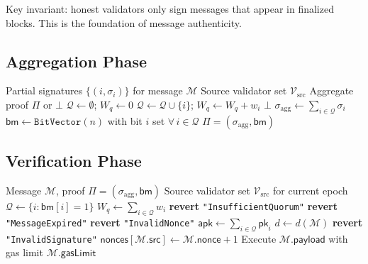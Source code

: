 Key invariant: honest validators only sign messages that appear in finalized blocks. This is the foundation of message authenticity.

\subsection{Aggregation Phase}

\begin{algorithm}[H]
\caption{Signature Aggregation (Relayer)}
\label{alg:aggregation}
\begin{algorithmic}[1]
\Require Partial signatures $\{(i, \sigma_i)\}$ for message $\mathcal{M}$
\Require Source validator set $\mathcal{V}_{\text{src}}$
\Ensure Aggregate proof $\Pi$ or $\bot$
\State $\mathcal{Q} \gets \emptyset$; $W_q \gets 0$
     
        \State $\mathcal{Q} \gets \mathcal{Q} \cup \{i\}$; $W_q \gets W_q + w_i$
    \EndIf
\EndFor
{}
    \State \Return $\bot$ 
\EndIf
\State $\sigma_{\text{agg}} \gets \sum_{i \in \mathcal{Q}} \sigma_i$ 
\State $\mathsf{bm} \gets \texttt{BitVector}(n)$ with bit $i$ set $\forall\, i \in \mathcal{Q}$
\State \Return $\Pi = (\sigma_{\text{agg}}, \mathsf{bm})$
\end{algorithmic}
\end{algorithm}

\subsection{Verification Phase}

\begin{algorithm}[H]
\caption{On-Chain Warp Verification (Destination Appchain)}
\label{alg:verification}
\begin{algorithmic}[1]
\Require Message $\mathcal{M}$, proof $\Pi = (\sigma_{\text{agg}}, \mathsf{bm})$
\Require Source validator set $\mathcal{V}_{\text{src}}$ for current epoch
\State $\mathcal{Q} \gets \{i : \mathsf{bm}[i] = 1\}$
\State $W_q \gets \sum_{i \in \mathcal{Q}} w_i$
    \State \textbf{revert} \texttt{"InsufficientQuorum"}
\EndIf
{}
    \State \textbf{revert} \texttt{"MessageExpired"}
\EndIf
{}
    \State \textbf{revert} \texttt{"InvalidNonce"}
\EndIf
\State $\mathsf{apk} \gets \sum_{i \in \mathcal{Q}} \mathsf{pk}_i$
\State $d \gets d(\mathcal{M})$
    \State \textbf{revert} \texttt{"InvalidSignature"}
\EndIf
\State $\mathsf{nonces}[\mathcal{M}.\mathsf{src}] \gets \mathcal{M}.\mathsf{nonce} + 1$
\State Execute $\mathcal{M}.\mathsf{payload}$ with gas limit $\mathcal{M}.\mathsf{gasLimit}$
\end{algorithmic}
\end{algorithm}

